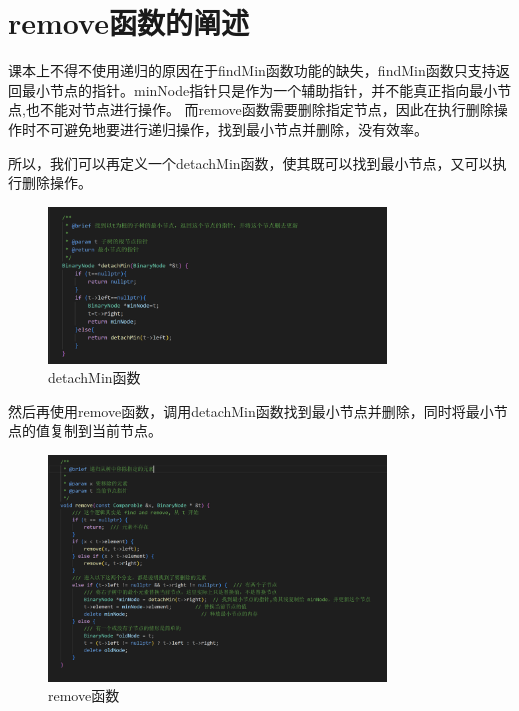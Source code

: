 \documentclass[UTF8]{ctexart}
\begin{document}
\pagestyle{fancy}
\fancyhead{}

\section{remove函数的阐述}
    课本上不得不使用递归的原因在于findMin函数功能的缺失，findMin函数只支持返回最小节点的指针。minNode指针只是作为一个辅助指针，并不能真正指向最小节点,也不能对节点进行操作。
    而remove函数需要删除指定节点，因此在执行删除操作时不可避免地要进行递归操作，找到最小节点并删除，没有效率。
     
    所以，我们可以再定义一个detachMin函数，使其既可以找到最小节点，又可以执行删除操作。
    \begin{figure}[htbp] %
        \centering
        \includegraphics[width=0.8\textwidth]{detachMin.png} %
        \caption{detachMin函数} %
        \label{1} %
    \end{figure}

    然后再使用remove函数，调用detachMin函数找到最小节点并删除，同时将最小节点的值复制到当前节点。
    \begin{figure}[htbp] %
        \centering
        \includegraphics[width=0.8\textwidth]{remove.png} %
        \caption{remove函数} %
        \label{2} %
    \end{figure}
\end{document}
